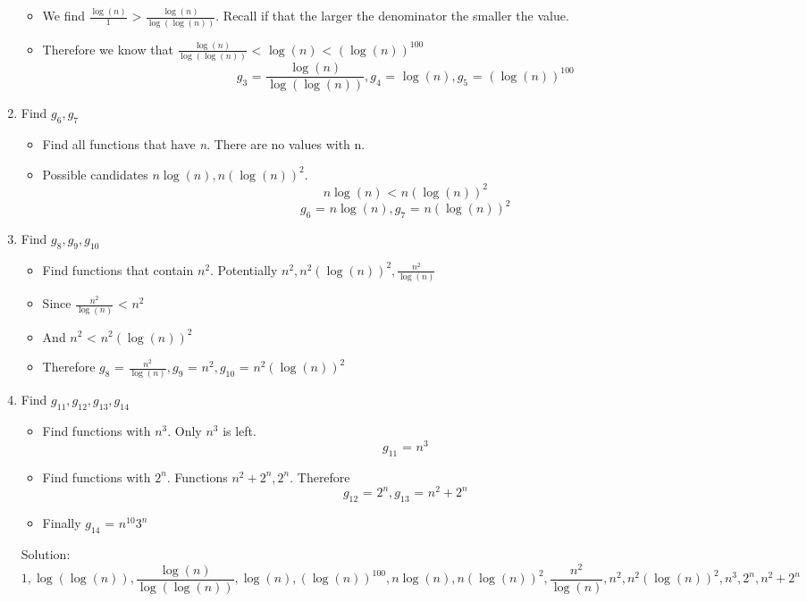 \documentclass[11pt,fleqn]{book}
\begin{document}
\begin{example}
\begin{enumerate}
\begin{itemize}
        \item We find $\frac{\log(n)}{1} \text{ > } \frac{\log(n)}{\log(\log(n))}$. Recall if that the larger the denominator the smaller the value.
        \item Therefore we know that $\frac{\log(n)}{\log(\log(n))} \text{ < } \log(n) \text{ < }  (\log(n))^{100} $
        $$g_3 \text{ = } \frac{\log(n)}{\log(\log(n))}, g_{4} \text{ = } \log(n) , g_5 \text{ = } (\log(n))^{100}$$
    \end{itemize}
    \item Find $g_6, g_7$
        \begin{itemize}
            \item Find all functions that have \textit{n}. There are no values with n. 
            \item Possible candidates $n\log(n), n(\log(n))^2$. $$n\log(n) \text{ < }  n(\log(n))^2$$
            $$g_6 \text{ = }  n\log(n) , g_7 \text{ = }  n(\log(n))^2$$
        \end{itemize}
    \item Find $g_8, g_9, g_10$
    \begin{itemize}
        \item Find functions that contain $n^2$. Potentially $n^2, n^2(\log(n))^2, \frac{n^2}{\log(n)}$
        \item Since $\frac{n^2}{\log(n)} \text{ < }  n^2$
        \item And $n^2 \text{ < }  n^2(\log(n))^2 $
        \item Therefore $g_8$ = $\frac{n^2}{\log(n)}, g_9 \text{ = }  n^2, g_{10} \text{ = }  n^2(\log(n))^2$
    \end{itemize}
    \item Find $g_{11}, g_{12}, g_{13}, g_{14}$
    \begin{itemize}
        \item Find functions with $n^3$. Only $n^3$ is left. $$g_{11} \text{ = }  n^3$$
        \item Find functions with $2^n$. Functions $n^2 + 2^n, 2^n$. Therefore 
        $$g_{12} \text{ = } 2^n, g_{13} \text{ = } n^2 + 2^n$$
        \item Finally $g_{14} \text{ = } n^{10}3^n$
    \end{itemize}
    \color{blue}
    Solution: $$1, \log(\log(n)), \frac{\log(n)}{\log(\log(n))}, \log(n), (\log(n))^{100}, n\log(n), n(\log(n))^2, \frac{n^2}{\log(n)}, n^2, n^2(\log(n))^2, n^3, 2^n, n^2 + 2^n$$ 
    \large
    \color{black} 
\end{enumerate}
\end{example}
\end{document}
